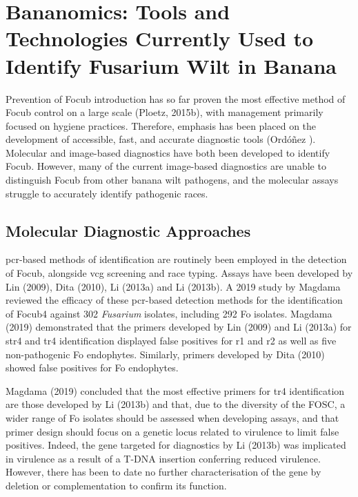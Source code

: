 \section{Bananomics: Tools and Technologies Currently Used to Identify Fusarium Wilt  in Banana}

Prevention of \ac{Focub} introduction has so far proven the most effective method of \ac{Focub} control on a large scale (Ploetz, 2015b), with management primarily focused on hygiene practices. Therefore, emphasis has been placed on the development of accessible, fast, and accurate diagnostic tools (Ordóñez ). Molecular and image-based diagnostics have both been developed to identify \ac{Focub}. However, many of the current image-based diagnostics are unable to distinguish \ac{Focub} from other banana wilt pathogens, and the molecular assays struggle to accurately identify pathogenic races.  

\subsection{Molecular Diagnostic Approaches}
\Ac{pcr}-based methods of identification are routinely been employed in the detection of \ac{Focub}, alongside \ac{vcg} screening and race typing. Assays have been developed by Lin \et (2009), Dita \et (2010), Li \et (2013a) and Li \et (2013b). A 2019 study by Magdama \et reviewed the efficacy of these \ac{pcr}-based detection methods for the identification of \ac{Focub4} against 302 \textit{Fusarium} isolates, including 292 \ac{Fo} isolates. Magdama \et (2019) demonstrated that the primers developed by Lin \et (2009) and Li \et (2013a) for \ac{str4} and \ac{tr4} identification displayed false positives for \ac{r1} and \ac{r2} as well as five non-pathogenic \ac{Fo} endophytes. Similarly, primers developed by Dita \et (2010) showed false positives for \ac{Fo} endophytes. 

Magdama \et (2019) concluded that the most effective primers for \ac{tr4} identification are those developed by Li \et (2013b) and that, due to the diversity of the \ac{FOSC}, a wider range of \ac{Fo} isolates should be assessed when developing assays, and that primer design should focus on a genetic locus related to virulence to limit false positives.  Indeed, the gene targeted for diagnostics by Li \et (2013b) was implicated in virulence as a result of a T-DNA insertion conferring reduced virulence. However, there has been to date no further characterisation of the gene by deletion or complementation to confirm its function.  

